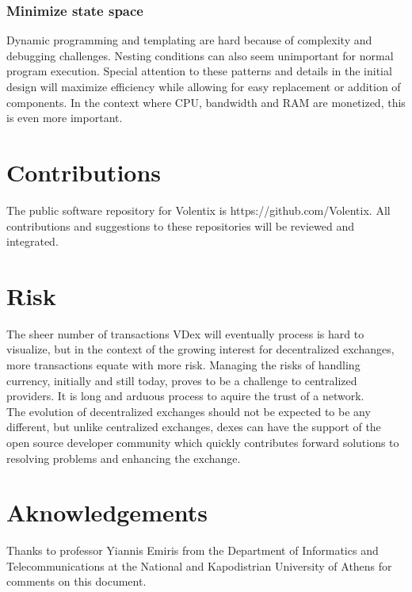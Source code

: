 \documentclass[]{article}
\begin{document}
{	\subsubsection{Minimize state space}
	Dynamic programming and templating are hard because of complexity and debugging challenges. 
	Nesting conditions can also seem unimportant for normal program execution.
	Special attention to these patterns and details in the initial design will maximize efficiency while allowing for easy replacement or addition of components.   
	In the context where CPU, bandwidth and RAM are monetized, this is even more important. 

\section{Contributions}
The public software repository for Volentix is https://github.com/Volentix.
All contributions and suggestions to these repositories will be reviewed and integrated. 
	
\section{Risk}
	The sheer number of transactions VDex will eventually process is hard to visualize, 
	but in the context of the growing interest for decentralized exchanges, more transactions equate with more risk. 
	Managing the risks of handling currency, initially and still today, proves to be a challenge to centralized providers. It is long and arduous process to aquire
	the trust of a network.\\
	 The evolution of decentralized exchanges should not be expected to be any different, but unlike centralized exchanges, 
	dexes can have the support of the open source developer community which quickly contributes 
	forward solutions to resolving problems and enhancing the exchange. \\
	

\paragraph{}
\paragraph{}	

\section{Aknowledgements}
Thanks to professor Yiannis Emiris
from the Department of Informatics and Telecommunications 
at the National and Kapodistrian University of Athens for comments on this document.
	
}
\end{document}
